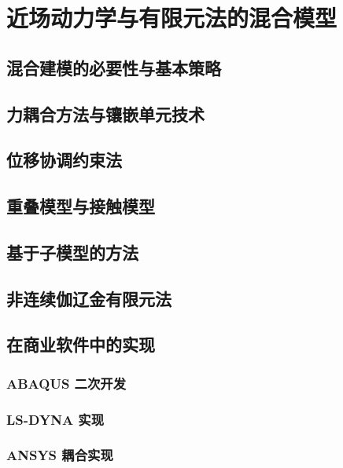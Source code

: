 \chapter{近场动力学与有限元法的混合模型}

\section{混合建模的必要性与基本策略}

\section{力耦合方法与镶嵌单元技术}

\section{位移协调约束法}

\section{重叠模型与接触模型}

\section{基于子模型的方法}

\section{非连续伽辽金有限元法}

\section{在商业软件中的实现}
\subsection{ABAQUS 二次开发}
\subsection{LS-DYNA 实现}
\subsection{ANSYS 耦合实现}
